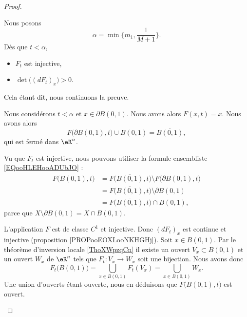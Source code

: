 \begin{proof}
\begin{subproof}

		Nous posons
		\begin{equation}
			\alpha=\min\{ m_1, \frac{1}{ M+1} \}.
		\end{equation}
		Dès que \( t<\alpha\),
		\begin{itemize}
			\item
			      \( F_t\) est injective,
			\item
			      \( \det\Big( (dF_t)_x \Big)>0\).
		\end{itemize}
		Cela étant dit, nous continuons la preuve.


		Nous considérons \( t<\alpha\) et \( x\in\partial B(0,1)\). Nous avons alors \( F(x,t)=x\). Nous avons alors
		\begin{equation}
			F\big( \partial B(0,1),t \big)\cup B(0,1)=\overline{B(0,1)},
		\end{equation}
		qui est fermé dans \( \eR^n\).

		Vu que \( F_t\) est injective, nous pouvons utiliser la formule ensembliste \eqref{EQooHLEHooADUbJO} :
		\begin{subequations}		\label{SUBEQSooLWJLooBEVkro}
			\begin{align}
				F\big( B(0,1), t \big) & =F\big( \overline{B(0,1)}, t \big)\setminus F\big( \partial B(0,1), t \big) \\
				                       & =F\big( \overline{B(0,1)}, t \big)\setminus \partial B(0,1)                 \\
				                       & =F\big( \overline{B(0,1)}, t \big)\cap  B(0,1),
			\end{align}
		\end{subequations}
		parce que \( X\setminus \partial B(0,1)=X\cap B(0,1)\).


		L'application \( F\) est de classe \( C^1\) et injective. Donc \( (dF_t)_x\) est continue et injective (proposition \ref{PROPooEOXLooNKHGHj}). Soit \( x\in B(0,1)\). Par le théorème d'inversion locale \ref{ThoXWpzqCn} il existe un ouvert \( V_x\subset B(0,1)\) et un ouvert \( W_x\) de \( \eR^n\) tels que \(F_t \colon V_x\to W_x  \) soit une bijection. Nous avons donc
		\begin{equation}		\label{EQooDCMAooVJnhxy}
			F_t\big( B(0,1) \big)=\bigcup_{x\in B(0,1)}F_t(V_x)=\bigcup_{x\in B(0,1)}W_x.
		\end{equation}
		Une union d'ouverts étant ouverte, nous en déduisons que \( F\big( B(0,1),t \big)\) est ouvert.


\end{subproof}
\end{proof}
